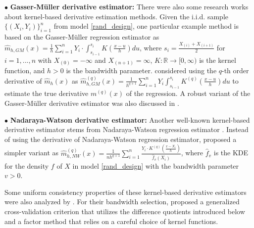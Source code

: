 \documentclass{uwstat572}
\theoremstyle{definition}
\renewcommand{\hat}{\widehat}
\theoremstyle{theorem}
\begin{document}
$\bullet$ {\bf Gasser-M{\"u}ller derivative estimator:} There were also some research works about kernel-based derivative estimation methods. Given the i.i.d. sample $\{(X_i,Y_i)\}_{i=1}^n$ from model \eqref{rand_design}, one particular example method is based on the Gasser-M{\"u}ller regression estimator \citep{gasser1979kernel} as $\hat{m}_{h,GM}(x) = \frac{1}{h} \sum_{i=1}^n Y_i\cdot \int_{s_{i-1}}^{s_i} K\left(\frac{x-u}{h}\right) du$, where $s_i=\frac{X_{(i)}+X_{(i+1)}}{2}$ for $i=1,...,n$ with $X_{(0)}=-\infty$ and $X_{(n+1)}=\infty$, $K:\mathbb{R}\to [0,\infty)$ is the kernel function, and $h>0$ is the bandwidth parameter. \cite{gasser1984estimating} considered using the $q$-th order derivative of $\hat{m}_h(x)$ as $\hat{m}_{h,GM}^{(q)}(x) = \frac{1}{h^{q+1}} \sum\limits_{i=1}^n Y_i\int_{s_{i-1}}^{s_i} K^{(q)}\left(\frac{x-u}{h}\right) du$ to estimate the true derivative $m^{(q)}(x)$ of the regression. A robust variant of the Gasser-M{\"u}ller derivative estimator was also discussed in \cite{hardle1985robust}.

$\bullet$ {\bf Nadaraya-Watson derivative estimator:} Another well-known kernel-based derivative estimator stems from Nadaraya-Watson regression estimator \citep{nadaraya1964estimating,watson1964smooth}. Instead of using the derivative of Nadaraya-Watson regression estimator, \cite{mack1989derivative} proposed a simpler variant as $\hat{m}_{h,NW}^{(q)}(x) = \frac{1}{nh^{q+1}} \sum\limits_{i=1}^n \frac{Y_i \cdot K^{(q)}\left(\frac{x-X_i}{h}\right)}{\hat{f}_v(X_i)}$, where $\hat{f}_v$ is the KDE for the density $f$ of $X$ in model \eqref{rand_design} with the bandwidth parameter $v>0$.

Some uniform consistency properties of these kernel-based derivative estimators were also analyzed by \cite{delecroix1996nonparametric}. For their bandwidth selection, \citet{rice1986bandwidth,muller1987bandwidth} proposed a generalized cross-validation criterion that utilizes the difference quotients introduced below and a factor method that relies on a careful choice of kernel functions.
\end{document}
